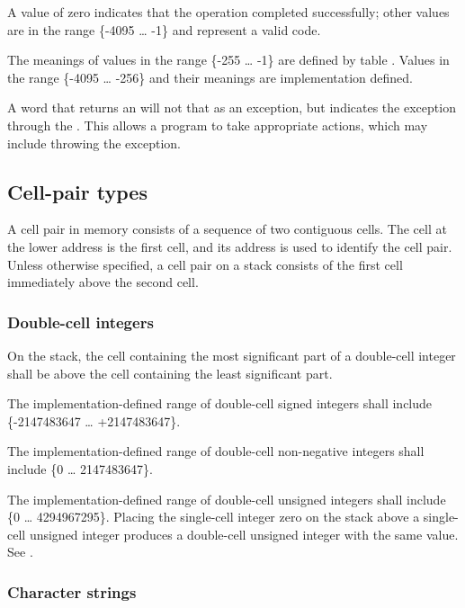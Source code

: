 A value of zero indicates that the operation completed successfully;
other values are in the range \{-4095 {\ldots} -1\} and represent a
valid  code.

The meanings of values in the range \{-255 {\ldots} -1\} are defined
by table .  Values in
the range \{-4095 {\ldots} -256\} and their meanings are implementation
defined.

A word that returns an  will not 
that  as an exception, but indicates the exception through
the .
This allows a program to take appropriate actions, which may include
throwing the exception.

\subsection{Cell-pair types} %
\label{usage:2cell}

A cell pair in memory consists of a sequence of two contiguous
cells. The cell at the lower address is the first cell, and its
address is used to identify the cell pair. Unless otherwise
specified, a cell pair on a stack consists of the first cell
immediately above the second cell.

\subsubsection{Double-cell integers} %

On the stack, the cell containing the most significant part of a
double-cell integer shall be above the cell containing the least
significant part.

The implementation-defined range of double-cell signed integers
shall include \{-2147483647 {\ldots} \linebreak +2147483647\}.

The implementation-defined range of double-cell non-negative
integers shall include \{0 {\ldots} 2147483647\}.

The implementation-defined range of double-cell unsigned integers
shall include \{0 {\ldots} 4294967295\}. Placing the single-cell
integer zero on the stack above a single-cell unsigned integer
produces a double-cell unsigned integer with the same value.
See .

\subsubsection{Character strings} %

